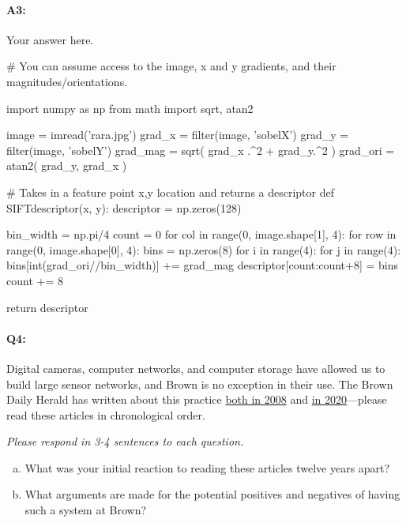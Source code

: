 \paragraph{A3:} Your answer here.

\begin{python}
# You can assume access to the image, x and y gradients, and their magnitudes/orientations.

import numpy as np
from math import sqrt, atan2

image = imread('rara.jpg')
grad_x = filter(image, 'sobelX')
grad_y = filter(image, 'sobelY')
grad_mag = sqrt( grad_x .^2 + grad_y.^2 )
grad_ori = atan2( grad_y, grad_x )

# Takes in a feature point x,y location and returns a descriptor
def SIFTdescriptor(x, y):
    descriptor = np.zeros(128)

    bin_width = np.pi/4
    count = 0
    for col in range(0, image.shape[1], 4):
        for row in range(0, image.shape[0], 4):
            bins = np.zeros(8)
            for i in range(4):
                for j in range(4):
                    bins[int(grad_ori//bin_width)] += grad_mag
            descriptor[count:count+8] = bins
            count += 8

    return descriptor
\end{python}





\pagebreak
\paragraph{Q4:}
Digital cameras, computer networks, and computer storage have allowed us to build large sensor networks, and Brown is no exception in their use. The Brown Daily Herald has written about this practice \href{https://www.browndailyherald.com/2008/01/10/surveillance-cameras-on-campus-triple/}{both in 2008} and \href{https://www.browndailyherald.com/2020/02/21/cameras-installed-hegeman-hall/}{in 2020}---please read these articles in chronological order.

\emph{Please respond in 3-4 sentences to each question.}

\begin{enumerate}[(a)]
    \item What was your initial reaction to reading these articles twelve years apart?
    \item What arguments are made for the potential positives and negatives of having such a system at Brown?
\end{enumerate}

